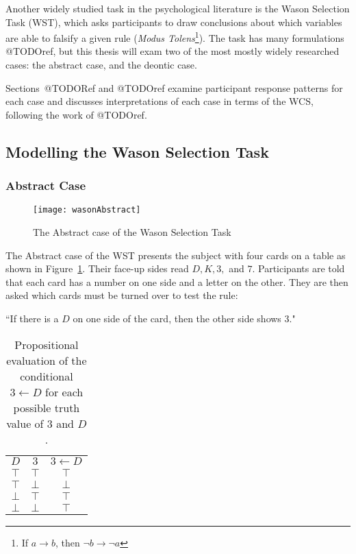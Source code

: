 Another widely studied task in the psychological literature is the Wason Selection Task (WST), which asks participants to draw conclusions about which variables are able to falsify a given rule (\textit{Modus Tolens}\footnote{If $a\rightarrow b$, then $\lnot b \rightarrow \lnot a$}). The task has many formulations @TODOref, but this thesis will exam two of the most mostly widely researched cases: the abstract case, and the deontic case.

Sections~@TODORef and @TODOref examine participant response patterns for each case and discusses interpretations of each case in terms of the WCS, following the work of @TODOref. 

\subsection{Modelling the Wason Selection Task} \label{ssec:wst_mod}

\subsubsection*{Abstract Case}

\begin{figure}
\begin{center}
\texttt{[image: wasonAbstract]}
\caption{The Abstract case of the Wason Selection Task}
\end{center}
\label{fig:wst}
\end{figure}

The Abstract case of the WST presents the subject with four cards on a table as shown in Figure~\ref{fig:wst}. Their face-up sides read $D, K, 3,$ and $7$. Participants are told that each card has a number on one side and a letter on the other. They are then asked which cards must be turned over to test the rule:

\begin{center}
``If there is a $D$ on one side of the card, then the other side shows $3$."
\end{center} 

\begin{table}
\begin{center}


\begin{tabular}{ c c c}
  \textbf{$D$}&  \textbf{$3$}& \textbf{$3\leftarrow D$} \\ 
 $\top$ & $\top$ & $\top$\\  
 $\top$ & $\bot$ & $\bot$\\  
 $\bot$ & $\top$ & $\top$\\
 $\bot$ & $\bot$ & $\top$
\end{tabular}
\caption{Propositional evaluation of the conditional $3 \leftarrow D$ for each possible truth value of $3$ and $D$.}
\label{tbl:wst_classical}
\end{center}
\end{table}


